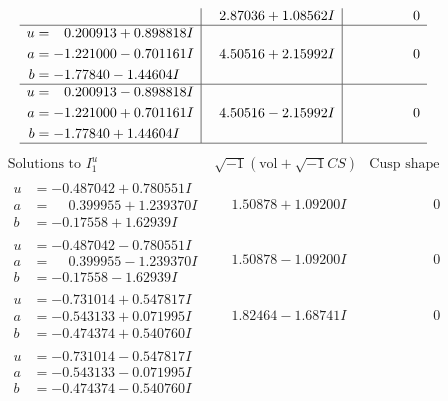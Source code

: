 \documentclass[1p]{elsarticle_modified}
\theoremstyle{definition}
\newcommand{\I}{\sqrt{-1}}
\begin{document}
$$\begin{array}{c|c|c}
 & \phantom{-}2.87036 + 1.08562 I & \phantom{-0.000000 } 0 \\ \hline\begin{aligned}
u &= \phantom{-}0.200913 + 0.898818 I \\
a &= -1.221000 - 0.701161 I \\
b &= -1.77840 - 1.44604 I\end{aligned}
 & \phantom{-}4.50516 + 2.15992 I & \phantom{-0.000000 } 0 \\ \hline\begin{aligned}
u &= \phantom{-}0.200913 - 0.898818 I \\
a &= -1.221000 + 0.701161 I \\
b &= -1.77840 + 1.44604 I\end{aligned}
 & \phantom{-}4.50516 - 2.15992 I & \phantom{-0.000000 } 0\\
 \hline 
 \end{array}$$\newpage$$\begin{array}{c|c|c}  
\text{Solutions to }I^u_{1}& \I (\text{vol} + \sqrt{-1}CS) & \text{Cusp shape}\\
 \hline 
\begin{aligned}
u &= -0.487042 + 0.780551 I \\
a &= \phantom{-}0.399955 + 1.239370 I \\
b &= -0.17558 + 1.62939 I\end{aligned}
 & \phantom{-}1.50878 + 1.09200 I & \phantom{-0.000000 } 0 \\ \hline\begin{aligned}
u &= -0.487042 - 0.780551 I \\
a &= \phantom{-}0.399955 - 1.239370 I \\
b &= -0.17558 - 1.62939 I\end{aligned}
 & \phantom{-}1.50878 - 1.09200 I & \phantom{-0.000000 } 0 \\ \hline\begin{aligned}
u &= -0.731014 + 0.547817 I \\
a &= -0.543133 + 0.071995 I \\
b &= -0.474374 + 0.540760 I\end{aligned}
 & \phantom{-}1.82464 - 1.68741 I & \phantom{-0.000000 } 0 \\ \hline\begin{aligned}
u &= -0.731014 - 0.547817 I \\
a &= -0.543133 - 0.071995 I \\
b &= -0.474374 - 0.540760 I\end{aligned}

\end{array}$$
\end{document}
